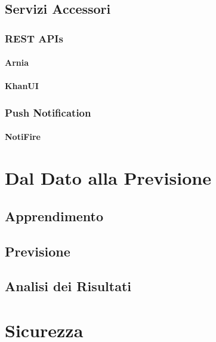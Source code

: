 \pagebreak

\subsection{Servizi Accessori}

\subsubsection{REST APIs}

\paragraph{Arnia}

\paragraph{KhanUI}

\subsubsection{Push Notification}

\paragraph{NotiFire}

\pagebreak

\section{Dal Dato alla Previsione}

\subsection{Apprendimento}

\pagebreak

\subsection{Previsione}

\pagebreak

\subsection{Analisi dei Risultati}

\pagebreak

\section{Sicurezza}
